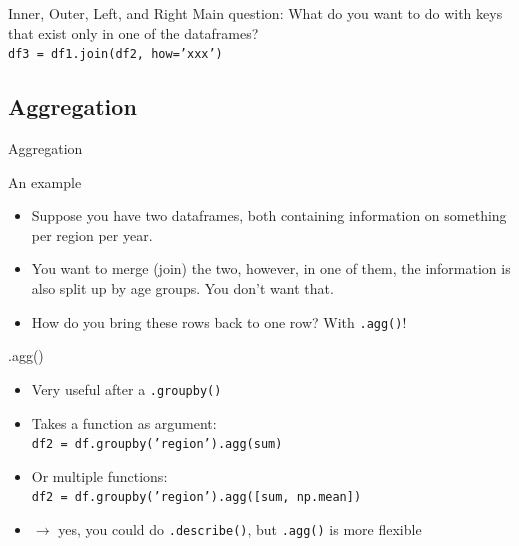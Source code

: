 \documentclass[handout]{beamer}
\begin{document}
\begin{frame}[fragile]{Inner, Outer, Left, and Right}
Main question: What do you want to do with keys that exist only in one of the  dataframes? \\
\pause
\vfill
\texttt{df3 = df1.join(df2, how='xxx')}\\
\vfill

\end{frame}



\subsection{Aggregation}
\begin{frame}[plain]
Aggregation
\end{frame}

\begin{frame}{An example}
\begin{itemize}
	\item Suppose you have two dataframes, both containing information on something  per region per year.
	\item 	You want to merge (join) the two, however, in one of them, the information is also split up by age groups. You don’t want that.
	\item 	How do you bring these rows back to one row? With \texttt{.agg()}!
\end{itemize}

\end{frame}


\begin{frame}{.agg()}
\begin{itemize}[<+->]
	\item Very useful after a \texttt{.groupby()}
	\item Takes a function as argument: \\	\texttt{df2 = df.groupby('region').agg(sum)}
	\item Or multiple functions: \\ \texttt{df2 = df.groupby('region').agg([sum, np.mean])}
	\item $\rightarrow$ yes, you could do \texttt{.describe()}, but \texttt{.agg()} is more flexible	
\end{itemize}
\end{frame}
\end{document}
